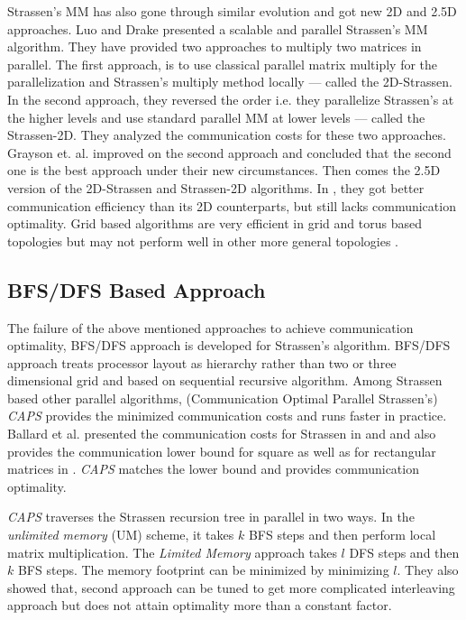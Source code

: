 Strassen's MM has also gone through similar evolution and got new 2D and 2.5D approaches. Luo and Drake \cite{luo1995scalable} presented a scalable and parallel Strassen's MM algorithm. They have provided two approaches to multiply two matrices in parallel. The first approach, is to use classical parallel matrix multiply for the parallelization and Strassen's multiply method locally --- called the 2D-Strassen. In the second approach, they reversed the order i.e. they parallelize Strassen's at the higher levels and use standard parallel MM at lower levels --- called the Strassen-2D. They analyzed the communication costs for these two approaches. Grayson et. al. \cite{grayson1996high} improved on the second approach and concluded that the second one is the best approach under their new circumstances. Then comes the 2.5D version of the 2D-Strassen and Strassen-2D algorithms. In \cite{solomonik2011improving}, they got better communication efficiency than its 2D counterparts, but still lacks communication optimality. Grid based algorithms are very efficient in grid and torus based topologies but may not perform well in other more general topologies \cite{demmel2013communication}.

\subsection{BFS/DFS Based Approach}
The failure of the above mentioned approaches to achieve communication optimality, BFS/DFS approach is developed \cite{ballard2012communication} for Strassen's algorithm. BFS/DFS approach treats processor layout as hierarchy rather than two or three dimensional grid and based on sequential recursive algorithm. Among Strassen based other parallel algorithms, (Communication Optimal Parallel Strassen's) \textit{CAPS} \cite{lipshitz2012communication} provides the minimized communication costs and runs faster in practice. Ballard et al. presented the communication costs for Strassen in \cite{ballard2012graph} and \cite{ballard2012communication} and also provides the communication lower bound for square as well as for rectangular matrices in \cite{demmel2013communication}. \textit{CAPS} matches the lower bound and provides communication optimality. 

\textit{CAPS} traverses the Strassen recursion tree in parallel in two ways. In the \textit{unlimited memory} (UM) scheme, it takes $k$ BFS steps and then perform local matrix multiplication. The \textit{Limited Memory} approach takes $l$ DFS steps and then $k$ BFS steps. The memory footprint can be minimized by minimizing $l$. They also showed that, second approach can be tuned to get more complicated interleaving approach but does not attain optimality more than a constant factor. 

